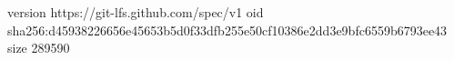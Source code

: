 version https://git-lfs.github.com/spec/v1
oid sha256:d45938226656e45653b5d0f33dfb255e50cf10386e2dd3e9bfc6559b6793ee43
size 289590
